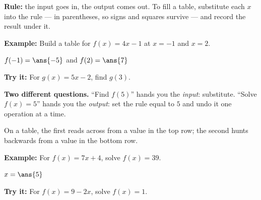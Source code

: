 \documentclass[12pt]{article}
\begin{document}


\begin{formulabox}
\textbf{Rule:} the input goes in, the output comes out. To fill a table, substitute each $x$ into the rule --- in parentheses, so signs and squares survive --- and record the result under it.
\end{formulabox}

\begin{examplebox}
\textbf{Example:} \quad Build a table for $f(x) = 4x - 1$ at $x = -1$ and $x = 2$.

$f(-1) = \ans{-5}$ \quad and \quad $f(2) = \ans{7}$
\end{examplebox}

\begin{tryitbox}
\textbf{Try it:} \quad For $g(x) = 5x - 2$, find $g(3)$.\\[2pt]
\end{tryitbox}


\begin{formulabox}
\textbf{Two different questions.} ``Find $f(5)$'' hands you the \emph{input}: substitute. ``Solve $f(x) = 5$'' hands you the \emph{output}: set the rule equal to $5$ and undo it one operation at a time.\par
On a table, the first reads across from a value in the top row; the second hunts backwards from a value in the bottom row.
\end{formulabox}

\begin{examplebox}
\textbf{Example:} \quad For $f(x) = 7x + 4$, solve $f(x) = 39$.

$x = \ans{5}$
\end{examplebox}

\begin{tryitbox}
\textbf{Try it:} \quad For $f(x) = 9 - 2x$, solve $f(x) = 1$.\\[2pt]
\end{tryitbox}
\end{document}
